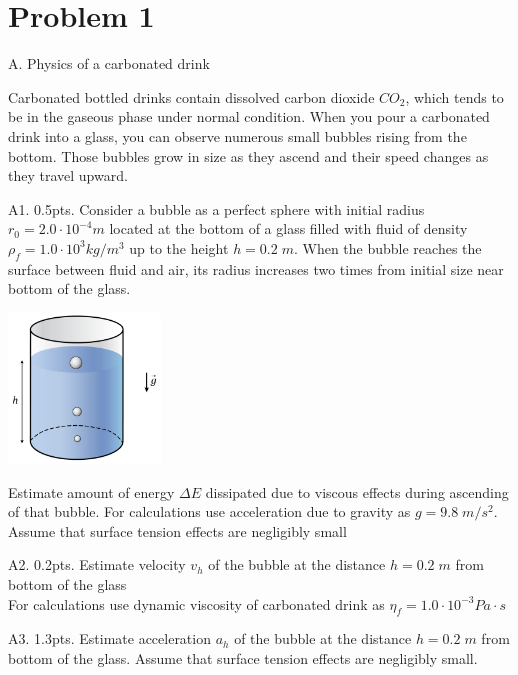 
\section*{Problem 1}
\begin{problem}{A. Physics of a carbonated drink}

Carbonated bottled drinks contain dissolved carbon dioxide $CO_2$, which tends to be in the gaseous phase under normal condition. When you pour a carbonated drink into a glass, you can observe numerous small bubbles rising from the bottom. Those bubbles grow in size as they ascend and their speed changes as they travel upward.
\end{problem}

\begin{subpr}{A1. \hfill 0.5pts.}
Consider a bubble as a perfect sphere with initial radius ${r_0 = 2.0\cdot 10^{-4}m}$ located at the bottom of a glass filled with fluid of density ${\rho_f = 1.0\cdot 10^{3}kg/m^3}$ up to the height ${h = 0.2\;m}$. When the bubble reaches the surface between fluid and air, its radius increases two times from initial size near bottom of the glass.
\vspace{2mm}
\begin{center} 
    \includegraphics[height=4cm]{Images/1_bbl_theory_carbonated.PNG}
\end{center}
\vspace{2mm}

Estimate amount of energy ${\Delta E}$ dissipated due to viscous effects during ascending of that bubble. For calculations use acceleration due to gravity as ${g = 9.8\;m/s^2}$. Assume that surface tension effects are negligibly small
\end{subpr}
\begin{subpr}{A2. \hfill 0.2pts.} Estimate velocity ${v_h}$ of the bubble at the distance ${h = 0.2\;m}$ from bottom of the glass
\\
For calculations use dynamic viscosity of carbonated drink as ${\eta_f = 1.0\cdot 10^{-3}Pa\cdot s}$
\end{subpr}
\begin{subpr}{A3. \hfill 1.3pts.} 
Estimate acceleration ${a_h}$ of the bubble at the distance ${h = 0.2\;m}$ from bottom of the glass. Assume that surface tension effects are negligibly small.
\end{subpr}


